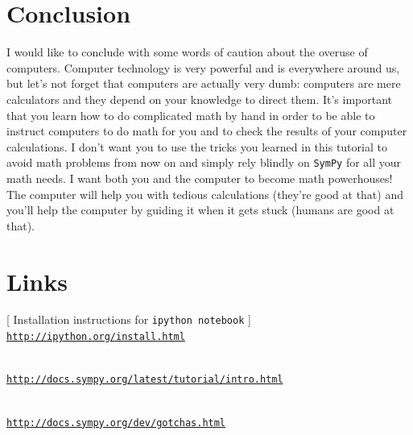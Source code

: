 \documentclass[9pt]{IEEEtran}
\begin{document}








\vspace{-2mm}
\section*{Conclusion}
\label{sec:conclusion}

I would like to conclude with some words of caution about the overuse of computers.
Computer technology is very powerful and is everywhere around us,
but let's not forget that computers are actually very dumb:
computers are mere calculators and they depend on your knowledge to direct them.
It's important that you learn how to do complicated math by hand in order to be 
able to instruct computers to do math for you and to check the results of your computer calculations.
I don't want you to use the tricks you learned in this tutorial to avoid math problems from now on
and simply rely blindly on \texttt{SymPy} for all your math needs.
I want both you and the computer to become math powerhouses!
The computer will help you with tedious calculations (they're good at that)
and you'll help the computer by guiding it when it gets  stuck (humans are good at that).





\section*{Links}
\label{sec:links}

[ Installation instructions for \texttt{ipython notebook} ] \\ 
\href{http://ipython.org/install.html}{\texttt{http://ipython.org/install.html}}

 \\ 
\href{http://docs.sympy.org/latest/tutorial/intro.html}{\texttt{http://docs.sympy.org/latest/tutorial/intro.html}}

 \\ 
\href{http://docs.sympy.org/dev/gotchas.html}{\texttt{http://docs.sympy.org/dev/gotchas.html}}
\end{document}
